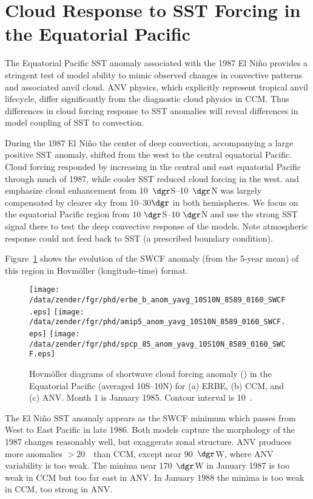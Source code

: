\documentclass[agums]{aguplus}
\begin{document}
\section{Cloud Response to SST Forcing in the Equatorial
Pacific}\label{sec:sst}

The Equatorial Pacific SST anomaly associated with the 1987 El Ni\~no
provides a stringent test of model ability to mimic observed
changes in convective patterns and associated anvil cloud.
ANV physics, which explicitly represent tropical anvil lifecycle,  
differ significantly from the diagnostic cloud physics in CCM.
Thus differences in cloud forcing response to SST anomalies will
reveal differences in model coupling of SST to convection.

During the 1987 El Ni\~no the center of deep convection, accompanying
a large positive SST anomaly, shifted from the west to the central
equatorial Pacific. 
Cloud forcing responded by increasing in the central and east
equatorial Pacific through much of 1987, while cooler SST reduced
cloud forcing in the west.
\cite{HaM93} and \cite{Cho94} emphasize cloud enhancement from
10~$\dgr$S--10~$\dgr$N was largely compensated by clearer sky
from 10--30$\dgr$ in both hemispheres.
We focus on the equatorial Pacific region from $10\
\dgr$S--$10\ \dgr$N and use the strong SST signal there to
test the deep convective response of the models. 
Note atmospheric response could not feed back to SST (a prescribed
boundary condition).  

Figure~\ref{fig:anom_yavg_10S10N_8589_0160_SWCF} shows the 
evolution of the SWCF anomaly (from the 5-year mean) of this region in
Hovm\"oller (longitude-time) format.
\begin{figure}
\begin{center}
\ifphdcsz{\setlength{\heightdim}{.9\textheight}}{\setlength{\heightdim}{\textheight}}
\texttt{[image: /data/zender/fgr/phd/erbe\_b\_anom\_yavg\_10S10N\_8589\_0160\_SWCF.eps]}\vfill
\texttt{[image: /data/zender/fgr/phd/amip5\_anom\_yavg\_10S10N\_8589\_0160\_SWCF.eps]}\vfill
\texttt{[image: /data/zender/fgr/phd/spcp\_85\_anom\_yavg\_10S10N\_8589\_0160\_SWCF.eps]}\vfill
\end{center}
\caption[Hovm\"oller diagrams of shortwave cloud forcing 
anomaly in the Equatorial Pacific for ERBE, CCM, and ANV]{
Hovm\"oller diagrams of shortwave cloud forcing anomaly (\wxmS) in the
Equatorial Pacific (averaged 10\dgr S--10\dgr N) for (a)
ERBE, (b) CCM, and (c) ANV.  
Month 1 is January 1985.  
Contour interval is 10~\wxmS. 
\label{fig:anom_yavg_10S10N_8589_0160_SWCF}}
\end{figure}
The El Ni\~no SST anomaly appears as the SWCF minimum which passes
from West to East Pacific in late 1986.
Both models capture the morphology of the 1987 changes reasonably
well, but exaggerate zonal structure. 
ANV produces more anomalies $> 20$~\wxmS\ than CCM, except near
90~$\dgr$W, where ANV variability is too weak.
The minima near 170~$\dgr$W in January 1987 is too weak in CCM but
too far east in ANV.
In January 1988 the minima is too weak in CCM, too strong in ANV.
\end{document}
